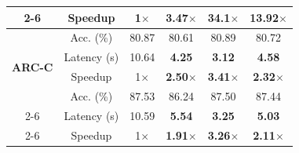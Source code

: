 \begin{table}[t!]
{\begin{tabular}{ccc|ccc}
\cmidrule{2-6} 
                                & Speedup        & 1$\times$         & \cellcolor{ora}\textbf{3.47}$\times$   & \cellcolor{ora}\textbf{34.1}$\times$       & \cellcolor{ora}\textbf{13.92}$\times$ \\ 
\midrule\midrule
\multirow{4}{*}{\textbf{ARC-C}}          
                                & Acc. (\%)      & 80.87             & 80.61         & 80.89                & 80.72                  \\ 
\cmidrule{2-6} 
                                & Latency (s)    & 10.64             & \textbf{4.25}          & \textbf{3.12}        & \textbf{4.58}          \\ 
\cmidrule{2-6} 
                                & Speedup        & 1$\times$         & \cellcolor{ora}\textbf{2.50}$\times$   & \cellcolor{ora}\textbf{3.41}$\times$       & \cellcolor{ora}\textbf{2.32}$\times$           \\ 
\midrule\midrule
\multirow{4}{*}{\textbf{ARC-E}}          
                                & Acc. (\%)      & 87.53             & 86.24         & 87.50                & 87.44                  \\ 
\cmidrule{2-6} 
                                & Latency (s)    & 10.59             & \textbf{5.54}          & \textbf{3.25}        & \textbf{5.03}          \\ 
\cmidrule{2-6} 
                                & Speedup        & 1$\times$         & \cellcolor{ora}\textbf{1.91}$\times$   & \cellcolor{ora}\textbf{3.26}$\times$       & \cellcolor{ora}\textbf{2.11}$\times$           \\ 
\midrule\midrule

\end{tabular}}
\end{table}
